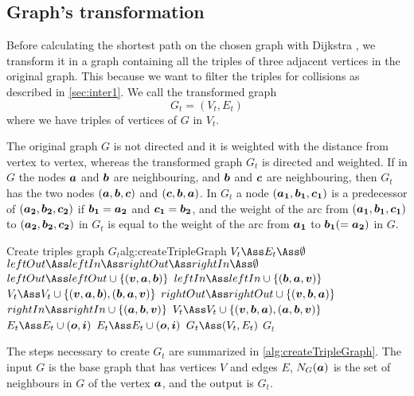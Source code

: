 \documentclass[dissertation.tex]{subfiles}
\begin{document}
\subsection{Graph's transformation}\label{sec:trigraph}
Before calculating the shortest path on the chosen graph with Dijkstra
\cite{dijkstra}\cite{knuth}, we
transform it in a graph containing all the triples
of three adjacent vertices in the original graph. This because we want
to filter the triples for collisions as described in
\cref{sec:inter1}. We call the transformed graph
$$G_t=(V_t,E_t)$$
where we have triples of vertices of $G$ in $V_t$.

The original graph $G$ is not directed and it is weighted
with the distance from vertex to vertex, whereas the transformed graph $G_t$ is
directed and weighted. If in $G$ the nodes $\boldsymbol{a}$
and $\boldsymbol{b}$ are
neighbouring, and $\boldsymbol{b}$ and $\boldsymbol{c}$ are neighbouring, then $G_t$
has the two nodes $(\boldsymbol{a},\boldsymbol{b},\boldsymbol{c})$ and $(\boldsymbol{c},\boldsymbol{b},\boldsymbol{a})$. In
$G_t$ a node $(\boldsymbol{a_1},\boldsymbol{b_1},\boldsymbol{c_1})$ is a predecessor of
$(\boldsymbol{a_2},\boldsymbol{b_2},\boldsymbol{c_2})$ if $\boldsymbol{b_1}=\boldsymbol{a_2}$ and $\boldsymbol{c_1}=\boldsymbol{b_2}$, and the weight of the arc
from $(\boldsymbol{a_1},\boldsymbol{b_1},\boldsymbol{c_1})$ to $(\boldsymbol{a_2},\boldsymbol{b_2},\boldsymbol{c_2})$ in $G_t$ is
equal to
the weight of the arc from $\boldsymbol{a_1}$ to $\boldsymbol{b_1}(=\boldsymbol{a_2})$ in $G$.

\begin{algo}{Create triples graph $G_t$}{alg:createTripleGraph}
  \State $V_t\Ass E_t\Ass \emptyset$
  \label{ln:tripleFor0}
  \State $leftOut\Ass leftIn\Ass rightOut\Ass rightIn\Ass \emptyset$
  \State $leftOut \Ass leftOut\cup \{(\ve{v},\ve{a},\ve{b})\}$
  \State $leftIn \Ass leftIn\cup \{(\ve{b},\ve{a},\ve{v})\}$
  \State $V_t \Ass V_t\cup \{(\ve{v},\ve{a},\ve{b}), (\ve{b},\ve{a},\ve{v})\}$
  \EndFor
  \State $rightOut \Ass rightOut\cup \{(\ve{v},\ve{b},\ve{a})\}$
  \State $rightIn \Ass rightIn\cup \{(\ve{a},\ve{b},\ve{v})\}$
  \State $V_t \Ass V_t\cup \{(\ve{v},\ve{b},\ve{a}), (\ve{a},\ve{b},\ve{v})\}$
  \EndFor
  \label{ln:tripleFor1}
  \State $E_t \Ass E_t\cup (\ve{o},\ve{i})$
  \EndFor
  \EndFor
  \label{ln:tripleFor2}
  \State $E_t \Ass E_t\cup (\ve{o},\ve{i})$
  \EndFor
  \EndFor
  \EndFor
  \State $G_t\Ass(V_t,E_t)$
  \State\Return $G_t$
  \EndFunction
\end{algo}
The steps necessary to create $G_t$ are summarized in
\cref{alg:createTripleGraph}. The input $G$ is the base graph
that has vertices $V$ and edges $E$, $N_G(\boldsymbol{a})$ is the set of
neighbours in $G$ of the vertex $\boldsymbol{a}$, and the output is $G_t$.
\end{document}
